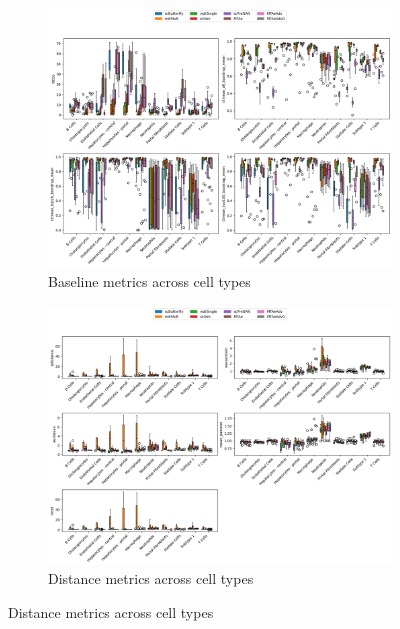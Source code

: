 \documentclass[12pt, a4paper]{article}
\begin{document}
\begin{figure}[h!]
    \centering
    \begin{subfigure}[t]{0.48\textwidth}
        \centering
        \includegraphics[width=\textwidth]{selected_benchmarking_cell_type_baseline_metrics_nault.png}
        \caption{Baseline metrics across cell types}
        \label{}
    \end{subfigure}
    \hfill
    \begin{subfigure}[t]{0.48\textwidth}
        \centering
        \includegraphics[width=\textwidth]{selected_benchmarking_cell_type_distance_metrics_nault.png}
        \caption{Distance metrics across cell types}
        \label{}
    \end{subfigure}

\end{figure}
\end{document}
